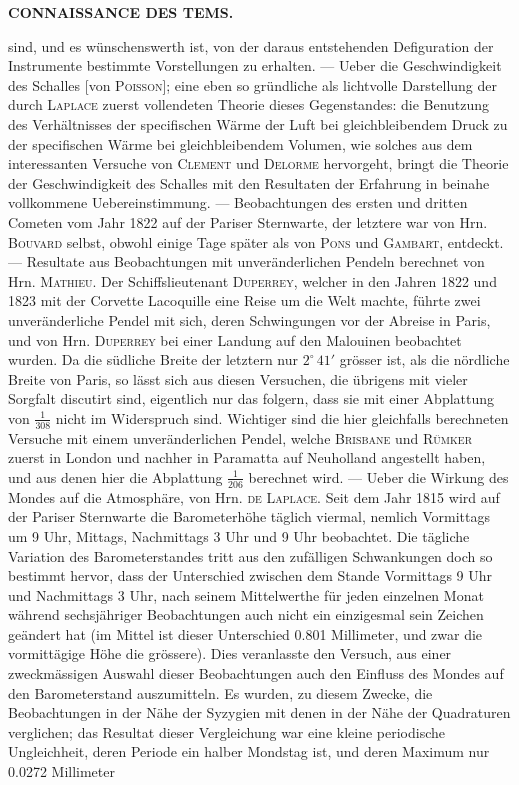 \noindent{}%
\makebox[12mm][l]{}%
\parbox[t]{\dimexpr\linewidth-24mm\relax}{\centering\footnotesize\bfseries CONNAISSANCE DES TEMS.\par}%
\par\medskip
\noindent sind, und es wünschenswerth ist, von der daraus entstehenden Defiguration der Instrumente bestimmte Vorstellungen zu erhalten. --- Ueber die Geschwindigkeit des Schalles [von \textsc{Poisson}]; eine eben so gründliche als lichtvolle Darstellung der durch \textsc{Laplace} zuerst vollendeten Theorie dieses Gegenstandes: die Benutzung des Verhältnisses der specifischen Wärme der Luft bei gleichbleibendem Druck zu der specifischen Wärme bei gleichbleibendem Volumen, wie solches aus dem interessanten Versuche von \textsc{Clement} und \textsc{Delorme} hervorgeht, bringt die Theorie der Geschwindigkeit des Schalles mit den Resultaten der Erfahrung in beinahe vollkommene Uebereinstimmung. --- Beobachtungen des ersten und dritten Cometen vom Jahr 1822 auf der Pariser Sternwarte, der letztere war von Hrn. \textsc{Bouvard} selbst, obwohl einige Tage später als von \textsc{Pons} und \textsc{Gambart}, entdeckt. --- Resultate aus Beobachtungen mit unveränderlichen Pendeln berechnet von Hrn. \textsc{Mathieu}. Der Schiffslieutenant \textsc{Duperrey}, welcher in den Jahren 1822 und 1823 mit der Corvette Lacoquille eine Reise um die Welt machte, führte zwei unveränderliche Pendel mit sich, deren Schwingungen vor der Abreise in Paris, und von Hrn. \textsc{Duperrey} bei einer Landung auf den Malouinen beobachtet wurden. Da die südliche Breite der letztern nur $2^\circ\,41'$ grösser ist, als die nördliche Breite von Paris, so lässt sich aus diesen Versuchen, die übrigens mit vieler Sorgfalt discutirt sind, eigentlich nur das folgern, dass sie mit einer Abplattung von $\frac{1}{308}$ nicht im Widerspruch sind. Wichtiger sind die hier gleichfalls berechneten Versuche mit einem unveränderlichen Pendel, welche \textsc{Brisbane} und \textsc{Rümker} zuerst in London und nachher in Paramatta auf Neuholland angestellt haben, und aus denen hier die Abplattung $\frac{1}{206}$ berechnet wird. --- Ueber die Wirkung des Mondes auf die Atmosphäre, von Hrn. \textsc{de Laplace}. Seit dem Jahr 1815 wird auf der Pariser Sternwarte die Barometerhöhe täglich viermal, nemlich Vormittags um 9 Uhr, Mittags, Nachmittags 3 Uhr und 9 Uhr beobachtet. Die tägliche Variation des Barometerstandes tritt aus den zufälligen Schwankungen doch so bestimmt hervor, dass der Unterschied zwischen dem Stande Vormittags 9 Uhr und Nachmittags 3 Uhr, nach seinem Mittelwerthe für jeden einzelnen Monat während sechsjähriger Beobachtungen auch nicht ein einzigesmal sein Zeichen geändert hat (im Mittel ist dieser Unterschied 0.801 Millimeter, und zwar die vormittägige Höhe die grössere). Dies veranlasste den Versuch, aus einer zweckmässigen Auswahl dieser Beobachtungen auch den Einfluss des Mondes auf den Barometerstand auszumitteln. Es wurden, zu diesem Zwecke, die Beobachtungen in der Nähe der Syzygien mit denen in der Nähe der Quadraturen verglichen; das Resultat dieser Vergleichung war eine kleine periodische Ungleichheit, deren Periode ein halber Mondstag ist, und deren Maximum nur 0.0272 Millimeter 
